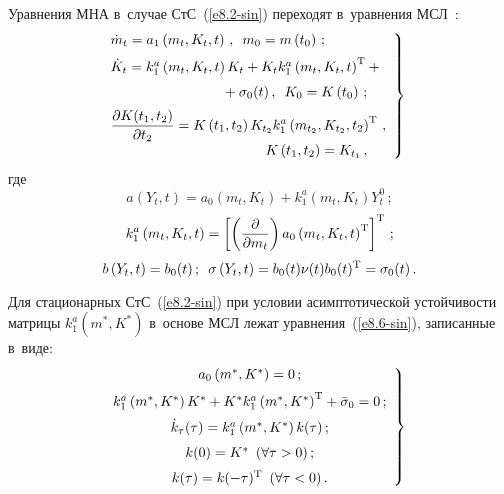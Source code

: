 \begin{multicols}{2}
Уравнения МНА в~случае СтС~(\ref{e8.2-sin}) переходят в~уравнения МСЛ~\cite{1-sin, 5-sin, 6-sin}:
     \begin{equation}
     \left.
     \hspace*{-3mm}\begin{array}{l}
     \dot m_t = a_1 \left(m_t, K_t, t\right)\,,\enskip 
     m_0 = m\left(t_0\right)\,;\\[6pt]
     \dot K_t = k_1^a \left(m_t, K_t, t\right) K_t + 
     K_t k_1^a \left(m_t, K_t, t\right)^{\mathrm{T}} +{}\\[6pt]
\hspace*{28mm}{}+\sigma_0(t)\,,\enskip 
     K_0 = K\left(t_0\right)\,;
     \\[6pt]
     \fr{\prt K(t_1, t_2)}{\prt t_2} = K\left(t_1, t_2\right) K_{t_2} 
   k_1^a  \left( m_{t_2}, K_{t_2}, t_2\right)^{\mathrm{T}}\,,\\[6pt] 
\hspace*{39mm}K\left(t_1, t_2\right) = K_{t_1}\,,
     \end{array}
     \right\}
     \label{e8.7-sin}
     \end{equation}
где
    $$
    a\left(Y_t,t\right) = a_0 \left(m_t, K_t\right) + 
    k_1^a \left(m_t, K_t\right) Y_t^0\,;$$
    $$ 
    k_1^a \left(m_t, K_t, t\right) =\left[ \left(\displaystyle\frac{\displaystyle \partial\mathstrut}{\displaystyle \partial m_t\mathstrut} \right)
    a_0 \left(m_t, K_t, t\right)^{\mathrm{T}}\right]^{\mathrm{T}}\,;
    $$
    $$
    b\left(Y_t,t\right) = b_0 (t)\,;\enskip 
    \sigma\left(Y_t, t\right)= b_0(t) \nu(t) b_0(t)^{\mathrm{T}} = \sigma_0(t)\,.
    $$

Для стационарных СтС~(\ref{e8.2-sin}) при условии асимптотической устойчивости 
матрицы $k_1^a (m^*, K^*)$ в~основе МСЛ лежат уравнения~(\ref{e8.6-sin}), 
записанные в~виде:
  \begin{equation}
    \left.
    \hspace*{-2.6mm}\begin{array}{c}
    a_0 \left(m^*, K^*\right) =0\,;\\[6pt]
    k_1^a \left( m^*,  K^*\right)  K^* +  K^* k_1^a \left( m^*,  K^*\right)^{\mathrm{T}} +
    \bar \sigma_0 =0\,;
  \\[6pt]
    \dot k_\tau (\tau) = k_1^a \left( m^*, K^*\right)k(\tau)\,;\\[6pt] 
    k(0) =K^* \enskip (\forall \tau >0)\,;\\[6pt] 
    k(\tau) = k (-\tau)^{\mathrm{T}} \enskip (\forall \tau <0)\,.
    \end{array}
    \right\}\!
    \label{e8.8-sin}
    \end{equation}


\end{multicols}
